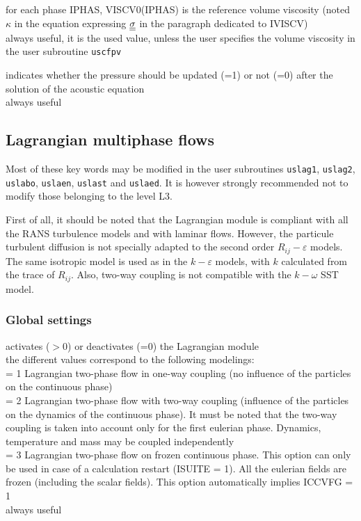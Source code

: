 {for each phase IPHAS, VISCV0(IPHAS) is the reference volume viscosity
(noted $\kappa$ in the equation expressing $\underline{\underline{\sigma}}$ in the
paragraph dedicated to IVISCV)\\
always useful, it is the used value, unless the user specifies the volume
viscosity in the user subroutine \texttt{uscfpv}}

{indicates whether the pressure should be updated (=1) or not (=0) after the
solution of the acoustic equation\\
always useful}

\subsection{Lagrangian multiphase flows}
\label{prg_motscles_lagr}

Most of these key words may be modified in the user subroutines
\texttt{uslag1}, \texttt{uslag2}, \texttt{uslabo}, \texttt{uslaen},
\texttt{uslast} and \texttt{uslaed}. It is however strongly recommended
not to modify those belonging to the level L3.

First of all, it should be noted that the Lagrangian module is compliant with
all the RANS turbulence models and with laminar flows. However, the particule
turbulent diffusion is not specially adapted to the second order
$R_{ij}-\varepsilon$ models. The same isotropic model is used as in the
$k-\varepsilon$ models, with $k$ calculated from the trace of $R_{ij}$. Also,
two-way coupling is not compatible with the $k-\omega$ SST model.


\subsubsection{Global settings}

{activates ($>$0) or deactivates (=0) the Lagrangian module\\
the different values correspond to the following modelings: \\ 
\hspace*{1.3cm} = 1 Lagrangian two-phase flow in one-way coupling (no influence of
the particles on the continuous phase)\\
\hspace*{1.3cm} = 2 Lagrangian two-phase flow with two-way coupling (influence of
the particles on the dynamics of the continuous phase).
It must be noted that the two-way coupling is taken
into account only for the first eulerian phase. Dynamics,
temperature and mass may be coupled independently\\ 
\hspace*{1.3cm} = 3 Lagrangian two-phase flow on frozen continuous phase. This option can
only be used in case of a calculation restart (ISUITE = 1). All the eulerian
fields are frozen (including the scalar fields). This option automatically
implies ICCVFG = 1\\
always useful}

